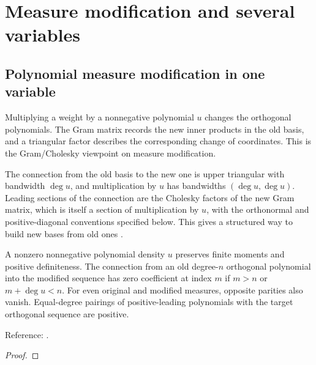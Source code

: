 \part{Measure modification and several variables}\label{part:beyond}

\chapter{Polynomial measure modification in one variable}\label{chap:modification}

Multiplying a weight by a nonnegative polynomial $u$ changes the orthogonal
polynomials. The Gram matrix records the new inner products in the old basis,
and a triangular factor describes the corresponding change of coordinates.
This is the Gram/Cholesky viewpoint on measure modification.

The connection from the old basis to the
new one is upper triangular with bandwidth $\deg u$, and multiplication by $u$
has bandwidths $(\deg u,\deg u)$. Leading sections of the connection are the
Cholesky factors of the new Gram matrix, which is itself a section of
multiplication by $u$, with the orthonormal and positive-diagonal conventions
specified below. This gives a structured way to build new bases from old ones
\cite{gautschi,gutleb-olver-slevinsky}.

\begin{theorem}
\label{thm:univariate-modification-support}
\leanok
A nonzero nonnegative polynomial density $u$ preserves finite moments and
positive definiteness. The connection from an old degree-$n$ orthogonal
polynomial into the modified sequence has zero coefficient at index $m$ if
$m>n$ or $m+\deg u<n$. For even original and modified measures, opposite
parities also vanish. Equal-degree pairings of positive-leading polynomials
with the target orthogonal sequence are positive.

Reference: \cite[Theorem 1.3 and Lemma 2.8]{gutleb-olver-slevinsky}.
\end{theorem}
\begin{proof}
\leanok
\end{proof}

